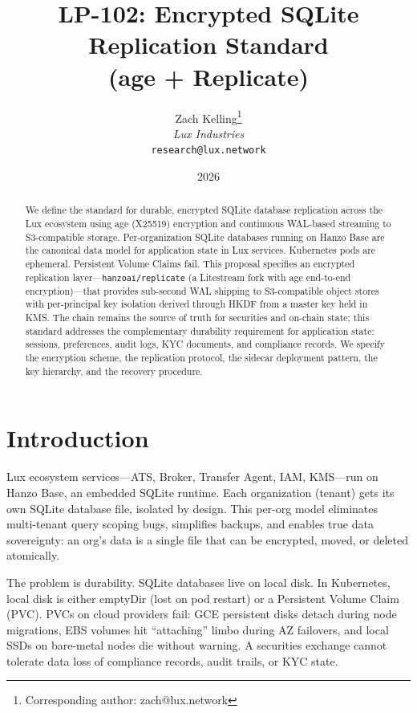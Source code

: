 \documentclass[11pt,a4paper]{article}
\title{LP-102: Encrypted SQLite Replication Standard\\(age + Replicate)}
\author{
Zach Kelling\thanks{Corresponding author: zach@lux.network}\\
\textit{Lux Industries}\\
\texttt{research@lux.network}
}
\date{2026}
\begin{document}
\luxcoverpage

\begin{abstract}
We define the standard for durable, encrypted SQLite database replication
across the Lux ecosystem using age (X25519) encryption and continuous
WAL-based streaming to S3-compatible storage. Per-organization SQLite
databases running on Hanzo Base are the canonical data model for
application state in Lux services. Kubernetes pods are ephemeral.
Persistent Volume Claims fail. This proposal specifies an encrypted
replication layer---\texttt{hanzoai/replicate} (a Litestream fork with
age end-to-end encryption)---that provides sub-second WAL shipping to
S3-compatible object stores with per-principal key isolation derived
through HKDF from a master key held in KMS. The chain remains the source
of truth for securities and on-chain state; this standard addresses the
complementary durability requirement for application state: sessions,
preferences, audit logs, KYC documents, and compliance records. We
specify the encryption scheme, the replication protocol, the sidecar
deployment pattern, the key hierarchy, and the recovery procedure.
\end{abstract}

\tableofcontents
\newpage

\section{Introduction}\label{sec:intro}

Lux ecosystem services---ATS, Broker, Transfer Agent, IAM, KMS---run
on Hanzo Base, an embedded SQLite runtime. Each organization (tenant)
gets its own SQLite database file, isolated by design. This per-org
model eliminates multi-tenant query scoping bugs, simplifies backups,
and enables true data sovereignty: an org's data is a single file that
can be encrypted, moved, or deleted atomically.

The problem is durability. SQLite databases live on local disk. In
Kubernetes, local disk is either emptyDir (lost on pod restart) or a
Persistent Volume Claim (PVC). PVCs on cloud providers fail: GCE
persistent disks detach during node migrations, EBS volumes hit
``attaching'' limbo during AZ failovers, and local SSDs on bare-metal
nodes die without warning. A securities exchange cannot tolerate data
loss of compliance records, audit trails, or KYC state.
\end{document}
